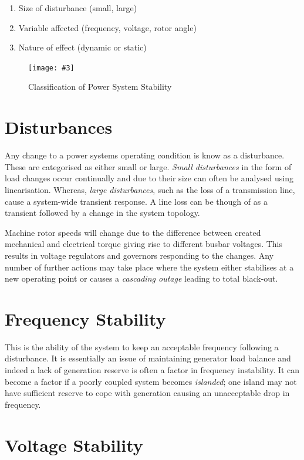 \documentclass[a4paper,oneside,12pt]{report}
\newcommand{\image}[3] {
  \begin{figure}
    \begin{center}
      \texttt{[image: \#3]}
      \caption{#2}
      \label{#1}
    \end{center}
  \end{figure}
}
\begin{document}
\begin{enumerate}
\item Size of disturbance (small, large)
\item Variable affected (frequency, voltage, rotor angle)
\item Nature of effect (dynamic or static)
\end{enumerate}

\image{stabilityclassification}{Classification of Power System Stability \cite{Kundur2004}}{stabilityclassification.png}

\section{Disturbances}

Any change to a power systems operating condition is know as a disturbance. These are categorised as either small or large. \emph{Small disturbances} in the form of load changes occur continually and due to their size can often be analysed using linearisation. Whereas, \emph{large disturbances}, such as the loss of a transmission line, cause a system-wide transient response. A line loss can be though of as a transient followed by a change in the system topology.

Machine rotor speeds will change due to the difference between created mechanical and electrical torque giving rise to different busbar voltages. This results in voltage regulators and governors responding to the changes. Any number of further actions may take place where the system either stabilises at a new operating point or causes a \emph{cascading outage} leading to total black-out.

\section{Frequency Stability}

This is the ability of the system to keep an acceptable frequency following a disturbance. It is essentially an issue of maintaining generator load balance and indeed a lack of generation reserve is often a factor in frequency instability. It can become a factor if a poorly coupled system becomes \emph{islanded}; one island may not have sufficient reserve to cope with generation causing an unacceptable drop in frequency.

\section{Voltage Stability}
\end{document}
